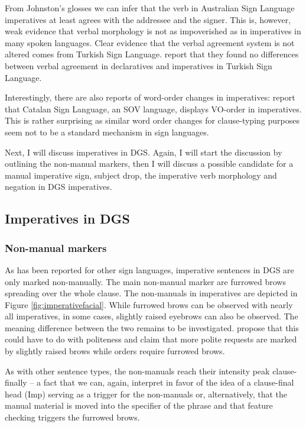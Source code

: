 \noindent From Johnston's glosses we can infer that the verb in Australian Sign Language imperatives at least agrees with the addressee and the signer. This is, however, weak evidence that verbal morphology is not as impoverished as in imperatives in many spoken languages. Clear evidence that the verbal agreement system is not altered comes from Turkish Sign Language. \citet{ozsoy2014commands} report that they found no differences between verbal agreement in declaratives and imperatives in Turkish Sign Language.

Interestingly, there are also reports of word-order changes in imperatives: \citet{donati2017searching} report that Catalan Sign Language, an SOV language, displays VO-order in imperatives. This is rather surprising as similar word order changes for clause-typing purposes seem not to be a standard mechanism in sign languages. 

Next, I will discuss imperatives in DGS. Again, I will start the discussion by outlining the non-manual markers, then I will discuss a possible candidate for a manual imperative sign, subject drop, the imperative verb morphology and negation in DGS imperatives. 

\subsection{Imperatives in DGS}\label{imperativesindgs}

\subsubsection{Non-manual markers}
As has been reported for other sign languages, imperative sentences in DGS are only marked non-manually. The main non-manual marker are furrowed brows spreading over the whole clause. The non-manuals in imperatives are depicted in Figure \ref{fig:imperativefacial}. While furrowed brows can be observed with nearly all imperatives, in some cases, slightly raised eyebrows can also be observed. The meaning difference between the two remains to be investigated. \citet[342]{happ2014vork} propose that this could have to do with politeness and claim that more polite requests are marked by slightly raised brows while orders require furrowed brows. 

As with other sentence types, the non-manuals reach their intensity peak clause-finally -- a fact that we can, again, interpret in favor of the idea of a clause-final head (Imp\textdegree ) serving as a trigger for the non-manuals or, alternatively, that the manual material is moved into the specifier of the phrase and that feature checking triggers the furrowed brows.

